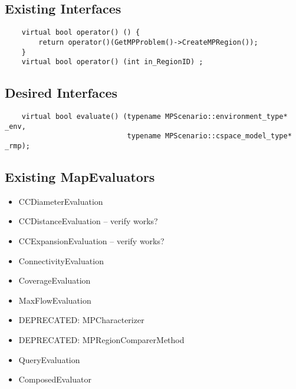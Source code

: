 \subsection{Existing Interfaces}
\begin{lstlisting}
    virtual bool operator() () {
        return operator()(GetMPProblem()->CreateMPRegion());
    }
    virtual bool operator() (int in_RegionID) ;
\end{lstlisting}

\subsection{Desired Interfaces}
\begin{lstlisting}
    virtual bool evaluate() (typename MPScenario::environment_type* _env,
                             typename MPScenario::cspace_model_type* _rmp);
\end{lstlisting}

\subsection{Existing MapEvaluators}

\begin{itemize}
\item CCDiameterEvaluation
\item CCDistanceEvaluation -- verify works?
\item CCExpansionEvaluation -- verify works?
\item ConnectivityEvaluation
\item CoverageEvaluation
\item MaxFlowEvaluation
\item DEPRECATED: MPCharacterizer
\item DEPRECATED: MPRegionComparerMethod
\item QueryEvaluation
\item ComposedEvaluator 
\end{itemize}